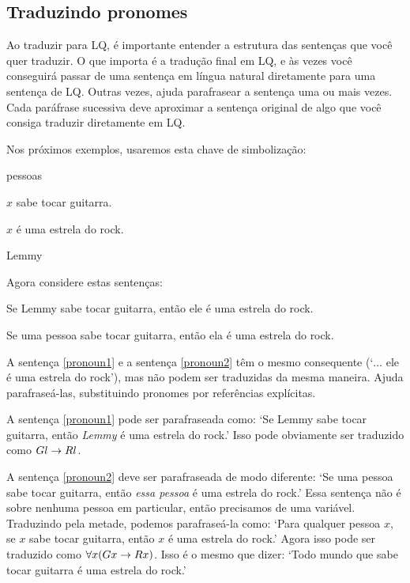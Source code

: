 \subsection{Traduzindo pronomes}
Ao traduzir para LQ, é importante entender a estrutura das sentenças que você quer traduzir. O que importa é a tradução final em LQ, e às vezes você conseguirá passar de uma sentença em língua natural diretamente para uma sentença de LQ. Outras vezes, ajuda parafrasear a sentença uma ou mais vezes. Cada paráfrase sucessiva deve aproximar a sentença original de algo que você consiga traduzir diretamente em LQ.

Nos próximos exemplos, usaremos esta chave de simbolização:

\begin{ekey}
\item[UD:] pessoas
\item[Gx:] $x$ sabe tocar guitarra.
\item[Rx:] $x$ é uma estrela do rock.
\item[l:] Lemmy
\end{ekey}

Agora considere estas sentenças:

\begin{earg}
\item[\ex{pronoun1}] Se Lemmy sabe tocar guitarra, então ele é uma estrela do rock.
\item[\ex{pronoun2}] Se uma pessoa sabe tocar guitarra, então ela é uma estrela do rock.
\end{earg}

A sentença \ref{pronoun1} e a sentença \ref{pronoun2} têm o mesmo consequente (`$\ldots$ ele é uma estrela do rock'), mas não podem ser traduzidas da mesma maneira. Ajuda parafraseá-las, substituindo pronomes por referências explícitas.

A sentença \ref{pronoun1} pode ser parafraseada como: `Se Lemmy sabe tocar guitarra, então \emph{Lemmy} é uma estrela do rock.' Isso pode obviamente ser traduzido como $Gl \rightarrow Rl$.

A sentença \ref{pronoun2} deve ser parafraseada de modo diferente: `Se uma pessoa sabe tocar guitarra, então \emph{essa pessoa} é uma estrela do rock.' Essa sentença não é sobre nenhuma pessoa em particular, então precisamos de uma variável. Traduzindo pela metade, podemos parafraseá-la como: `Para qualquer pessoa $x$, se $x$ sabe tocar guitarra, então $x$ é uma estrela do rock.' Agora isso pode ser traduzido como $\forall x (Gx \rightarrow Rx)$. Isso é o mesmo que dizer: `Todo mundo que sabe tocar guitarra é uma estrela do rock.'


